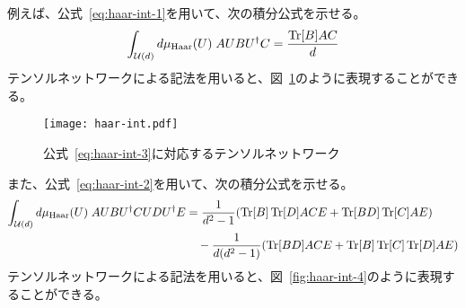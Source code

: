 \begin{comment}
\begin{figure}[H]
    \centering
    \begin{tikzpicture}[scale=1]
        \node[draw,rectangle]        (AT)  at (-4,0) {{\LARGE $A^T$}};
        \node[draw,rectangle,dashed] (eq1) at (-4,1) {{\Large $(A^T)_{ki}$}};
        \node[draw,rectangle]        (A)   at (2,0) {{\LARGE $A$}};
        \node[draw,rectangle,dashed] (eq2) at (2,1) {{\Large $A_{ik}$}};
        \draw (AT) -- (-6, 0) node[left] {$k$};
        \draw (AT) -- (-2,0) node[right] {$i$};
        \draw (-1,0) node {$=$};
        \draw (A) -- (0, 0) node[left] {$i$};
        \draw (A) -- (4,0) node[right] {$k$};
    \end{tikzpicture}
    \caption{行列の転置}
\end{figure}

\begin{figure}[H]
    \centering
    \texttt{[image: tensor-mat@vec.png]}
    \caption{}
\end{figure}

\begin{figure}[H]
    \centering
    \texttt{[image: tensor-vec-t.png]}
    \caption{}
\end{figure}

\begin{figure}[H]
    \centering
    \texttt{[image: tensor-mat-t.png]}
    \caption{}
\end{figure}
\end{comment}


例えば、公式~\eqref{eq:haar-int-1}を用いて、次の積分公式を示せる。
\begin{align}\label{eq:haar-int-3}
    \int_{\mathcal{U}(d)} d\mu_{\mathrm{Haar}}(U)\; AUBU^\dagger C = \frac{\Tr[B]AC}{d}
\end{align}
テンソルネットワークによる記法を用いると、図~\ref{fig:haar-int-3}のように表現することができる。

\begin{figure}[H]
    \centering
    \texttt{[image: haar-int.pdf]}
    \caption{公式~\eqref{eq:haar-int-3}に対応するテンソルネットワーク}
    \label{fig:haar-int-3}
\end{figure}

また、公式~\eqref{eq:haar-int-2}を用いて、次の積分公式を示せる。
\begin{align}\label{eq:haar-int-4}
    \int_{\mathcal{U}(d)} d\mu_{\mathrm{Haar}}(U)\;AUBU^\dagger CUDU^\dagger E &= \frac{1}{d^2-1}(\Tr[B]\Tr[D]ACE + \Tr[BD]\Tr[C]AE) \nonumber\\
    &\quad - \frac{1}{d(d^2-1)}(\Tr[BD]ACE + \Tr[B]\Tr[C]\Tr[D]AE)
\end{align}
テンソルネットワークによる記法を用いると、図~\ref{fig:haar-int-4}のように表現することができる。

